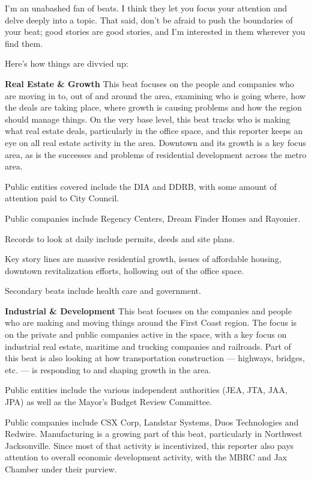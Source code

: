 \documentclass[
  11pt,
  american,
  letterpaperpaper,
  extrafontsizes,onecolumn,openright
  ]{memoir}
\begin{document}
I'm an unabashed fan of beats. I think they let you focus your attention and delve deeply into a topic. That said, don't be afraid to push the boundaries of your beat; good stories are good stories, and I'm interested in them wherever you find them.

Here's how things are divvied up:

\newpage

\textbf{Real Estate \& Growth}
This beat focuses on the people and companies who are moving in to, out of and around the area, examining who is going where, how the deals are taking place, where growth is causing problems and how the region should manage things. On the very base level, this beat tracks who is making what real estate deals, particularly in the office space, and this reporter keeps an eye on all real estate activity in the area. Downtown and its growth is a key focus area, as is the successes and problems of residential development across the metro area.

Public entities covered include the DIA and DDRB, with some amount of attention paid to City Council.

Public companies include Regency Centers, Dream Finder Homes and Rayonier.

Records to look at daily include permits, deeds and site plans.

Key story lines are massive residential growth, issues of affordable housing, downtown revitalization efforts, hollowing out of the office space.

Secondary beats include health care and government.

\textbf{Industrial \& Development}
This beat focuses on the companies and people who are making and moving things around the First Coast region. The focus is on the private and public companies active in the space, with a key focus on industrial real estate, maritime and trucking companies and railroads. Part of this beat is also looking at how transportation construction --- highways, bridges, etc. --- is responding to and shaping growth in the area.

Public entities include the various independent authorities (JEA, JTA, JAA, JPA) as well as the Mayor's Budget Review Committee.

Public companies include CSX Corp, Landstar Systems, Duos Technologies and Redwire. Manufacturing is a growing part of this beat, particularly in Northwest Jacksonville. Since most of that activity is incentivized, this reporter also pays attention to overall economic development activity, with the MBRC and Jax Chamber under their purview.
\end{document}

